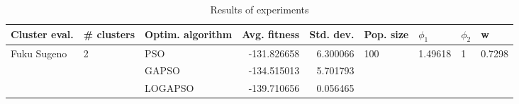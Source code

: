 \begin{table}
\centering
\caption{Results of experiments}
\begin{tabular}{lllrrllll}
\toprule
               Cluster eval. &        \# clusters & Optim. algorithm &  Avg. fitness &  Std. dev. &            Pop. size &               $\phi_{1}$ &         $\phi_{2}$ &                       w \\
\midrule
\multirow{3}{*}{Fuku Sugeno} & \multirow{3}{*}{2} &              PSO &   -131.826658 &   6.300066 & \multirow{3}{*}{100} & \multirow{3}{*}{1.49618} & \multirow{3}{*}{1} & \multirow{3}{*}{0.7298} \\
                             &                    &            GAPSO &   -134.515013 &   5.701793 &                      &                          &                    &                         \\
                             &                    &          LOGAPSO &   -139.710656 &   0.056465 &                      &                          &                    &                         \\
\bottomrule
\end{tabular}
\end{table}
